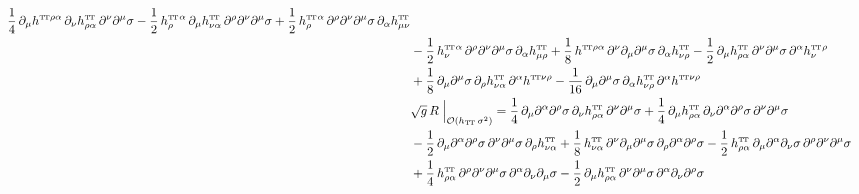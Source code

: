 \documentclass[11pt]{book}
\newcommand\TTspace{ -1pt }
\newcommand\TT{ \scriptscriptstyle{\mathrm{T\hspace{\TTspace}T}} }
\newcommand\hTT{ h_{\scriptscriptstyle{\mathrm{T\hspace{\TTspace}T}}} }
\numberwithin{equation}{chapter}
\begin{document}
\begin{appendices}
\begin{align}
    \frac{1}{4}  \, \partial_{\mu} h^{{\TT} \rho\alpha }        \, \partial_{\nu}  h^{{\TT}}_{\rho\alpha } \, \partial^{\nu}  \partial^{\mu} \sigma
  - \frac{1}{2}  \,                h^{{\TT}}_{\rho}{}^{\alpha } \, \partial_{\mu}  h^{{\TT}}_{\nu\alpha }  \, \partial^{\rho} \partial^{\nu} \partial^{\mu}\sigma
  + \frac{1}{2}  \,                h^{{\TT}}_{\rho}{}^{\alpha } \, \partial^{\rho} \partial^{\nu} \partial^{\mu} \sigma \, \partial_{\alpha } h^{{\TT}}_{\mu \nu} \nonumber \\
  &- \frac{1}{2} \,                h^{{\TT}}_{\nu}{}^{\alpha }  \, \partial^{\rho} \partial^{\nu} \partial^{\mu} \sigma \, \partial_{\alpha } h^{{\TT}}_{\mu \rho}
  + \frac{1}{8}  \,                h^{{\TT} \rho\alpha }        \, \partial^{\nu}  \partial_{\mu} \partial^{\mu} \sigma \, \partial_{\alpha } h^{{\TT}}_{\nu\rho}
  - \frac{1}{2}  \, \partial_{\mu} h^{{\TT}}_{\rho\alpha }      \, \partial^{\nu}  \partial^{\mu} \sigma \, \partial^{\alpha } h^{{\TT}}_{\nu}{}^{\rho} \nonumber \\
  &+ \frac{1}{8} \, \partial_{\mu} \partial^{\mu} \sigma \, \partial_{\rho}    h^{{\TT}}_{\nu\alpha } \, \partial^{\alpha } h^{{\TT} \nu\rho}
  - \frac{1}{16} \, \partial_{\mu} \partial^{\mu} \sigma \, \partial_{\alpha } h^{{\TT}}_{\nu\rho}    \, \partial^{\alpha } h^{{\TT} \nu\rho}
  \\
  &\sqrt{g} \, R \; \Big|_{\mathcal O(\hTT \, \sigma^2)} =
     \frac{1}{4}  \, \partial_{\mu} \partial^{\alpha } \partial^{\rho} \sigma \, \partial_{\nu} h^{{\TT}}_{\rho\alpha } \, \partial^{\nu} \partial^{\mu} \sigma
   + \frac{1}{4}  \, \partial_{\mu} h^{{\TT}}_{\rho\alpha } \, \partial_{\nu} \partial^{\alpha } \partial^{\rho} \sigma \, \partial^{\nu} \partial^{\mu} \sigma \nonumber \\
  &- \frac{1}{2}  \, \partial_{\mu} \partial^{\alpha } \partial^{\rho} \sigma \, \partial^{\nu} \partial^{\mu} \sigma \, \partial_{\rho} h^{{\TT}}_{\nu\alpha }
   + \frac{1}{8}  \, h^{{\TT}}_{\nu\alpha }  \, \partial^{\nu} \partial_{\mu} \partial^{\mu} \sigma \, \partial_{\rho}\partial^{\alpha }\partial^{\rho}\sigma
   - \frac{1}{2}  \, h^{{\TT}}_{\rho\alpha } \, \partial_{\mu}\partial^{\alpha }\partial_{\nu}\sigma \, \partial^{\rho}\partial^{\nu}\partial^{\mu}\sigma \nonumber \\
  &+ \frac{1}{4}  \, h^{{\TT}}_{\rho\alpha } \, \partial^{\rho}\partial^{\nu}\partial^{\mu}\sigma \, \partial^{\alpha }\partial_{\nu}\partial_{\mu}\sigma
   - \frac{1}{2}  \, \partial_{\mu}h^{{\TT}}_{\rho\alpha } \, \partial^{\nu}\partial^{\mu}\sigma \, \partial^{\alpha }\partial_{\nu}\partial^{\rho}\sigma

\end{align}
\end{appendices}
\end{document}
